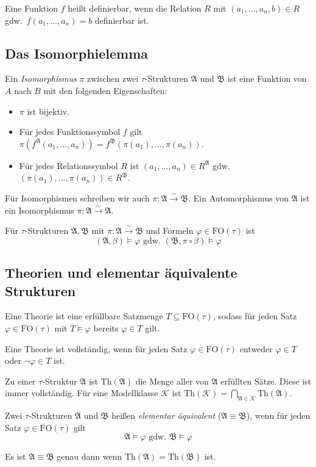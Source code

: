 \documentclass{panikzettel}
\newcommand{\A}{\mathfrak{A}}
\newcommand{\B}{\mathfrak{B}}
\newcommand{\FO}{\mathrm{FO}}
\newcommand{\isoTo}{\overset{\sim}{\to}}
\newcommand{\Th}{\mathrm{Th}}
\newcommand{\K}{\mathcal{K}}
\begin{document}
Eine Funktion $f$ heißt definierbar, wenn die Relation $R$ mit $(a_1, \ldots, a_n, b) \in R$ gdw.\ $f(a_1,\ldots,a_n) = b$ definierbar ist.

\subsection{Das Isomorphielemma}

Ein \emph{Isomorphismus} $\pi$ zwischen zwei $\tau$-Strukturen $\A$ und $\B$ ist eine Funktion von $A$ nach $B$ mit den folgenden Eigenschaften:
\begin{itemize}
\item $\pi$ ist bijektiv.
\item Für jedes Funktionssymbol $f$ gilt $\pi(f^\A(a_1, \ldots, a_n)) = f^\B(\pi(a_1),\ldots,\pi(a_n))$.
\item Für jedes Relationssymbol $R$ ist $(a_1,\ldots,a_n) \in R^\A$ gdw.\ $(\pi(a_1),\ldots,\pi(a_n)) \in R^\B$.
\end{itemize}
Für Isomorphismen schreiben wir auch $\pi: \A \isoTo \B$. Ein Automorphismus von $\A$ ist ein Isomorphismus $\pi : \A \isoTo \A$.

Für $\tau$-Strukturen $\A, \B$ mit $\pi : \A \isoTo \B$ und Formeln $\varphi \in \FO(\tau)$ ist
\[(\A, \beta) \models \varphi \text{ gdw.\ } (\B, \pi \circ \beta) \models \varphi\]

\subsection{Theorien und elementar äquivalente Strukturen}

Eine Theorie ist eine erfüllbare Satzmenge $T \subseteq \FO(\tau)$, sodass für jeden Satz $\varphi \in \FO(\tau)$ mit $T \models \varphi$ bereits $\varphi \in T$ gilt.

Eine Theorie ist vollständig, wenn für jeden Satz $\varphi \in \FO(\tau)$ entweder $\varphi \in T$ oder $\neg \varphi \in T$ ist.

Zu einer $\tau$-Struktur $\A$ ist $\Th(\A)$ die Menge aller von $\A$ erfüllten Sätze. Diese ist immer vollständig.
Für eine Modellklasse $\K$ ist $\Th(\K) = \bigcap_{\A \in \K} \Th(\A)$.

Zwei $\tau$-Strukturen $\A$ und $\B$ heißen \emph{elementar äquivalent} ($\A \equiv \B$), wenn für jeden Satz $\varphi \in \FO(\tau)$ gilt
\[\A \models \varphi \text{ gdw. } \B \models \varphi\]

Es ist $\A \equiv \B$ genau dann wenn $\Th(\A) = \Th(\B)$ ist.
\end{document}

